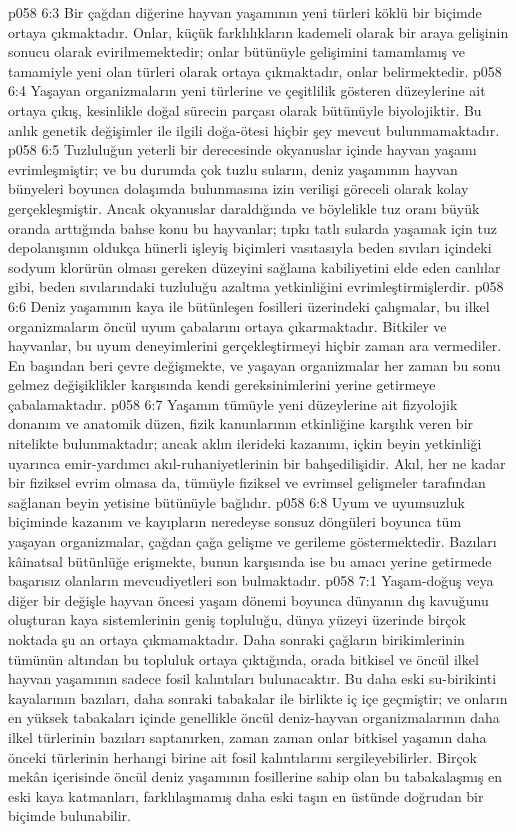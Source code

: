 \vs p058 6:3 Bir çağdan diğerine hayvan yaşamının yeni türleri köklü bir biçimde ortaya çıkmaktadır. Onlar, küçük farklılıkların kademeli olarak bir araya gelişinin sonucu olarak evirilmemektedir; onlar bütünüyle gelişimini tamamlamış ve tamamiyle yeni olan türleri olarak ortaya çıkmaktadır, onlar  belirmektedir.
\vs p058 6:4 Yaşayan organizmaların yeni türlerine ve çeşitlilik gösteren düzeylerine ait  ortaya çıkış, kesinlikle doğal sürecin parçası olarak bütünüyle biyolojiktir. Bu anlık genetik değişimler ile ilgili doğa\hyp{}ötesi hiçbir şey mevcut bulunmamaktadır.
\vs p058 6:5 Tuzluluğun yeterli bir derecesinde okyanuslar içinde hayvan yaşamı evrimleşmiştir; ve bu durumda çok tuzlu suların, deniz yaşamının hayvan bünyeleri boyunca dolaşımda bulunmasına izin verilişi göreceli olarak kolay gerçekleşmiştir. Ancak okyanuslar daraldığında ve böylelikle tuz oranı büyük oranda arttığında bahse konu bu hayvanlar; tıpkı tatlı sularda yaşamak için tuz depolanışının oldukça hünerli işleyiş biçimleri vasıtasıyla beden sıvıları içindeki sodyum klorürün olması gereken düzeyini sağlama kabiliyetini elde eden canlılar gibi, beden sıvılarındaki tuzluluğu azaltma yetkinliğini evrimleştirmişlerdir.
\vs p058 6:6 Deniz yaşamının kaya ile bütünleşen fosilleri üzerindeki çalışmalar, bu ilkel organizmaların öncül uyum çabalarını ortaya çıkarmaktadır. Bitkiler ve hayvanlar, bu uyum deneyimlerini gerçekleştirmeyi hiçbir zaman ara vermediler. En başından beri çevre değişmekte, ve yaşayan organizmalar her zaman bu sonu gelmez değişiklikler karşısında kendi gereksinimlerini yerine getirmeye çabalamaktadır.
\vs p058 6:7 Yaşamın tümüyle yeni düzeylerine ait fizyolojik donanım ve anatomik düzen, fizik kanunlarının etkinliğine karşılık veren bir nitelikte bulunmaktadır; ancak aklın ilerideki kazanımı, içkin beyin yetkinliği uyarınca emir\hyp{}yardımcı akıl\hyp{}ruhaniyetlerinin bir bahşedilişidir. Akıl, her ne kadar bir fiziksel evrim olmasa da, tümüyle fiziksel ve evrimsel gelişmeler tarafından sağlanan beyin yetisine bütünüyle bağlıdır.
\vs p058 6:8 Uyum ve uyumsuzluk biçiminde kazanım ve kayıpların neredeyse sonsuz döngüleri boyunca tüm yaşayan organizmalar, çağdan çağa gelişme ve gerileme göstermektedir. Bazıları kâinatsal bütünlüğe erişmekte, bunun karşısında ise bu amacı yerine getirmede başarısız olanların mevcudiyetleri son bulmaktadır.
\vs p058 7:1 Yaşam\hyp{}doğuş veya diğer bir değişle hayvan öncesi yaşam dönemi boyunca dünyanın dış kavuğunu oluşturan kaya sistemlerinin geniş topluluğu, dünya yüzeyi üzerinde birçok noktada şu an ortaya çıkmamaktadır. Daha sonraki çağların birikimlerinin tümünün altından bu topluluk ortaya çıktığında, orada bitkisel ve öncül ilkel hayvan yaşamının sadece fosil kalıntıları bulunacaktır. Bu daha eski su\hyp{}birikinti kayalarının bazıları, daha sonraki tabakalar ile birlikte iç içe geçmiştir; ve onların en yüksek tabakaları içinde genellikle öncül deniz\hyp{}hayvan organizmalarının daha ilkel türlerinin bazıları saptanırken, zaman zaman onlar bitkisel yaşamın daha önceki türlerinin herhangi birine ait fosil kalıntılarını sergileyebilirler. Birçok mekân içerisinde öncül deniz yaşamının fosillerine sahip olan bu tabakalaşmış en eski kaya katmanları, farklılaşmamış daha eski taşın en üstünde doğrudan bir biçimde bulunabilir.
